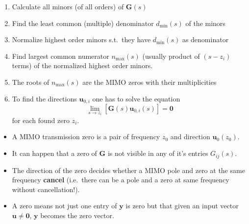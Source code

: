 \begin{enumerate}
    \item Calculate all minors (of all orders) of $\mathbf{G}(s)$
    \item Find the least common (multiple) denominator $d_{\min}(s)$ of the minors
    \item Normalize highest order minors s.t.\ they have $d_{\min}(s)$ as denominator
    \item Find largest common numerator $n_{\max}(s)$ (usually product of $(s-z_i)$ terms) of the normalized highest order minors.
    \item The roots of $n_{\max}(s)$ are the MIMO zeros with their multiplicities
    \item To find the directions $\mathbf{u}_{0,i}$ one has to solve the equation
          \begin{equation*}
              \lim_{s\to z_i}\left[\mathbf{G}(s)\mathbf{u}_{0,i}(s)\right]=\mathbf{0}
          \end{equation*}
          for each found zero $z_i$.
\end{enumerate}


\begin{itemize}
    \item A MIMO transmission zero is a pair of frequency $z_0$ and direction $\mathbf{u}_0(z_0)$.
    \item It can happen that a zero of $\mathbf{G}$ is not visible in any of it's entries $G_{ij}(s)$.
    \item The direction of the zero decides whether a MIMO pole and zero at the same frequency \textbf{cancel} (i.e.\ there can be a pole and a zero at same frequency without cancellation!).
    \item A zero means not just one entry of $\mathbf{y}$ is zero but that given an input vector $\mathbf{u} \ne \mathbf{0}$, $\mathbf{y}$ becomes the zero vector.
\end{itemize}

